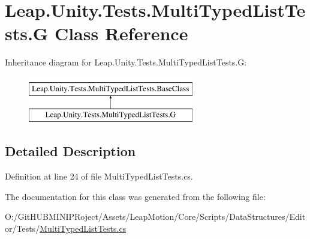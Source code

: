 \hypertarget{class_leap_1_1_unity_1_1_tests_1_1_multi_typed_list_tests_1_1_g}{}\section{Leap.\+Unity.\+Tests.\+Multi\+Typed\+List\+Tests.\+G Class Reference}
\label{class_leap_1_1_unity_1_1_tests_1_1_multi_typed_list_tests_1_1_g}
Inheritance diagram for Leap.\+Unity.\+Tests.\+Multi\+Typed\+List\+Tests.\+G\+:\begin{figure}[H]
\begin{center}
\leavevmode
\includegraphics[height=2.000000cm]{class_leap_1_1_unity_1_1_tests_1_1_multi_typed_list_tests_1_1_g}
\end{center}
\end{figure}


\subsection{Detailed Description}


Definition at line 24 of file Multi\+Typed\+List\+Tests.\+cs.



The documentation for this class was generated from the following file\+:\begin{DoxyCompactItemize}
\item 
O\+:/\+Git\+H\+U\+B\+M\+I\+N\+I\+P\+Roject/\+Assets/\+Leap\+Motion/\+Core/\+Scripts/\+Data\+Structures/\+Editor/\+Tests/\mbox{\hyperlink{_multi_typed_list_tests_8cs}{Multi\+Typed\+List\+Tests.\+cs}}\end{DoxyCompactItemize}
